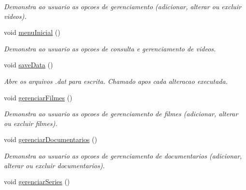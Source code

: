 \begin{DoxyCompactItemize}
\begin{DoxyCompactList}\small\item\em Demonstra ao usuario as opcoes de gerenciamento (adicionar, alterar ou excluir videos). \end{DoxyCompactList}\item 
void \hyperlink{classController_ab80bd964e9410be07f07ef3709681639}{menu\+Inicial} ()\hypertarget{classController_ab80bd964e9410be07f07ef3709681639}{}\label{classController_ab80bd964e9410be07f07ef3709681639}

\begin{DoxyCompactList}\small\item\em Demonstra ao usuario as opcoes de consulta e gerenciamento de videos. \end{DoxyCompactList}\item 
void \hyperlink{classController_aef69b3ce9427d64a8ae1c4c84289c2c7}{save\+Data} ()\hypertarget{classController_aef69b3ce9427d64a8ae1c4c84289c2c7}{}\label{classController_aef69b3ce9427d64a8ae1c4c84289c2c7}

\begin{DoxyCompactList}\small\item\em Abre os arquivos .dat para escrita. Chamado apos cada alteracao executada. \end{DoxyCompactList}\item 
void \hyperlink{classController_a724ebc287ae34ebd68164673ad2787dd}{gerenciar\+Filmes} ()\hypertarget{classController_a724ebc287ae34ebd68164673ad2787dd}{}\label{classController_a724ebc287ae34ebd68164673ad2787dd}

\begin{DoxyCompactList}\small\item\em Demonstra ao usuario as opcoes de gerenciamento de filmes (adicionar, alterar ou excluir filmes). \end{DoxyCompactList}\item 
void \hyperlink{classController_a4a2deed21d64ed714daefefeb77ba945}{gerenciar\+Documentarios} ()\hypertarget{classController_a4a2deed21d64ed714daefefeb77ba945}{}\label{classController_a4a2deed21d64ed714daefefeb77ba945}

\begin{DoxyCompactList}\small\item\em Demonstra ao usuario as opcoes de gerenciamento de documentarios (adicionar, alterar ou excluir documentarios). \end{DoxyCompactList}\item 
void \hyperlink{classController_a7fd6d8718d97d8b41f7406e60c909c75}{gerenciar\+Series} ()\hypertarget{classController_a7fd6d8718d97d8b41f7406e60c909c75}{}\label{classController_a7fd6d8718d97d8b41f7406e60c909c75}


\end{DoxyCompactItemize}
